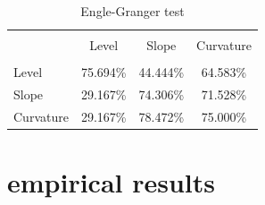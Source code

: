 \documentclass{article}
\begin{document}
\begin{table}[h]
\caption{Engle-Granger test} %
\fontsize{10}{10}\selectfont
\centering%
\begin{tabular}{l | ccc}%
\hline\hline \\ [-1.5ex]                         %

	&	Level	&	Slope	&	Curvature	\\
\hline \\ [-1.5ex]  
Level	&	75.694\%	&	44.444\%	&	64.583\%	\\
Slope	&	29.167\%	&	74.306\%	&	71.528\%	\\
Curvature	&	29.167\%	&	78.472\%	&	75.000\%	\\

\hline            
\end{tabular}
\label{table:nonlin}%
\end{table}

\clearpage 

\section{empirical results}
\end{document}
